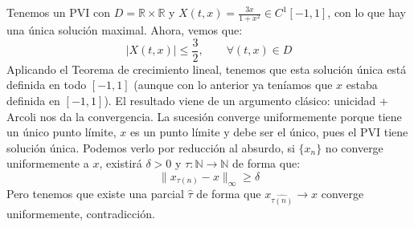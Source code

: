 \begin{ejercicio}
\begin{enumerate}
            Tenemos un PVI con $D=\mathbb{R}\times \mathbb{R}$ y $X(t,x) = \frac{3x}{1+x^2}\in C^1[-1,1]$, con lo que hay una única solución maximal. Ahora, vemos que:
            \begin{equation*}
                |X(t,x)| \leq \frac{3}{2}, \qquad \forall (t,x)\in D
            \end{equation*}
            Aplicando el Teorema de crecimiento lineal, tenemos que esta solución única está definida en todo $[-1,1]$ (aunque con lo anterior ya teníamos que $x$ estaba definida en $[-1,1]$). El resultado viene de un argumento clásico: unicidad + Arcoli nos da la convergencia. La sucesión converge uniformemente porque tiene un único punto límite, $x$ es un punto límite y debe ser el único, pues el PVI tiene solución única. Podemos verlo por reducción al absurdo, si $\{x_n\}$ no converge uniformemente a $x$, existirá $\delta>0$  y $\tau:\mathbb{N}\to \mathbb{N}$ de forma que:
            \begin{equation*}
                \|x_{\tau(n)} - x \|_\infty \geq \delta
            \end{equation*}
            Pero tenemos que existe una parcial $\hat{\tau}$ de forma que $x_{\hat{\tau(n)}}\to x$ converge uniformemente, contradicción.
    \end{enumerate}
\end{ejercicio}



